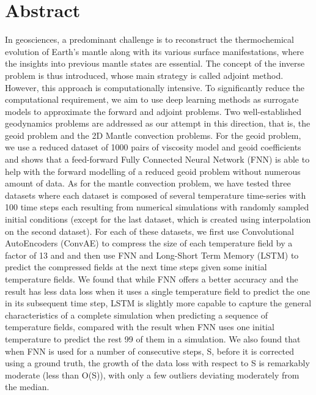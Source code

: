 \chapter*{Abstract}
In geosciences, a predominant challenge is to reconstruct the thermochemical evolution of Earth's mantle along with its various surface manifestations, where the insights into previous mantle states are essential. The concept of the inverse problem is thus introduced, whose main strategy is called adjoint method. However, this approach is computationally intensive. To significantly reduce the computational requirement, we aim to use deep learning methods as surrogate models to approximate the forward and adjoint problems. Two well-established geodynamics problems are addressed as our attempt in this direction, that is, the geoid problem and the 2D Mantle convection problems. For the geoid problem, we use a reduced dataset of 1000 pairs of viscosity model and geoid coefficients and shows that a feed-forward Fully Connected Neural Network (FNN) is able to help with the forward modelling of a reduced geoid problem without numerous amount of data. As for the mantle convection problem, we have tested three datasets where each dataset is composed of several temperature time-series with 100 time steps each resulting from numerical simulations with randomly sampled initial conditions (except for the last dataset, which is created using interpolation on the second dataset). For each of these datasets, we first use Convolutional AutoEncoders (ConvAE) to compress the size of each temperature field by a factor of 13 and and then use FNN and Long-Short Term Memory (LSTM) to predict the compressed fields at the next time steps given some initial temperature fields. We found that while FNN offers a better accuracy and the result has less data loss when it uses a single temperature field to predict the one in its subsequent time step, LSTM is slightly more capable to capture the general characteristics of a complete simulation when predicting a sequence of temperature fields, compared with the result when FNN uses one initial temperature to predict the rest 99 of them in a simulation. We also found that when FNN is used for a number of consecutive steps, S, before it is corrected using a ground truth, the growth of the data loss with respect to S is remarkably moderate (less than O(S)), with only a few outliers deviating moderately from the median.
